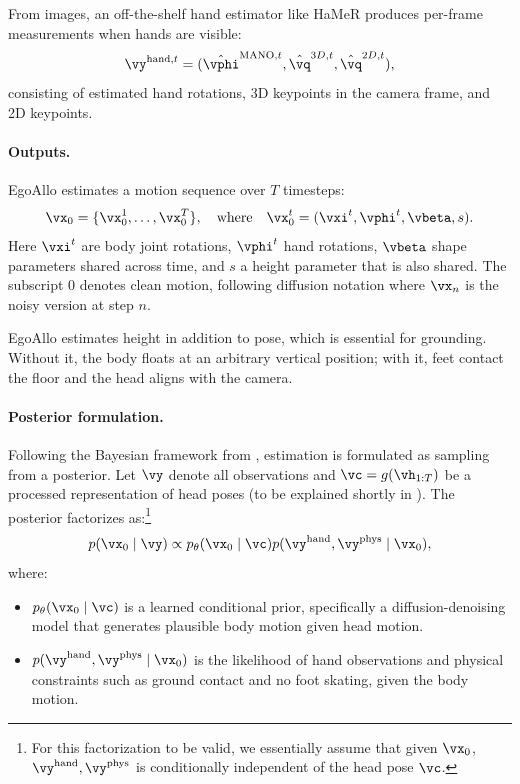 \documentclass[../../book-main.tex]{subfiles}
\begin{document}
From images, an off-the-shelf hand estimator like HaMeR
\citep{pavlakos2023hamer} produces per-frame measurements when hands
are visible:
\begin{equation}
    \vy^{\mathrm{hand},t} = (\hat{\vphi}^{\mathrm{MANO},t},
    \hat{\vq}^{3D,t}, \hat{\vq}^{2D,t}) ,
\end{equation}
consisting of estimated hand rotations, 3D keypoints in the camera
frame, and 2D keypoints.

\paragraph{Outputs.}
EgoAllo estimates a motion sequence over \(T\) timesteps:
\begin{equation}
    \vx_{0} = \{\vx_{0}^{1}, \dots, \vx_{0}^{T}\} ,
    \quad\text{where}\quad
    \vx_{0}^{t} = (\vxi^{t}, \vphi^{t}, \vbeta, s) .
\end{equation}
Here \(\vxi^{t}\) are body joint rotations, \(\vphi^{t}\) hand rotations,
\(\vbeta\) shape parameters shared across time, and \(s\) a height
parameter that is also shared. The subscript \(0\) denotes clean
motion, following diffusion notation where \(\vx_{n}\) is the noisy
version at step \(n\).

EgoAllo estimates height in addition to pose, which is essential for
grounding. Without it, the body floats at an arbitrary vertical
position; with it, feet contact the floor and the head aligns with the camera.

\paragraph{Posterior formulation.}
Following the Bayesian framework from
, estimation is formulated as
sampling from a posterior. Let \(\vy\) denote all observations
and \(\vc = g(\vh_{1:T})\) be a processed representation of
head poses (to be explained shortly in
). The posterior factorizes
as:\footnote{For this factorization to be valid, we essentially
    assume that given \(\vx_{0}\), \(\vy^{\mathrm{hand}},
    \vy^{\mathrm{phys}}\) is conditionally independent of the head
pose \(\vc\).}
\begin{equation}
    p(\vx_{0} \mid \vy) \propto
    p_{\theta}(\vx_{0} \mid
    \vc) p(\vy^{\mathrm{hand}},
    \vy^{\mathrm{phys}} \mid \vx_{0}) ,
\end{equation}
where:
\begin{itemize}
    \item \(p_{\theta}(\vx_{0} \mid \vc)\) is a learned conditional
        prior, specifically a diffusion-denoising model that
        generates plausible body motion given head motion.
    \item \(p(\vy^{\mathrm{hand}}, \vy^{\mathrm{phys}} \mid
        \vx_{0})\) is the likelihood of hand observations and
        physical constraints such as ground contact and no foot
        skating, given the body motion.
\end{itemize}
\end{document}
